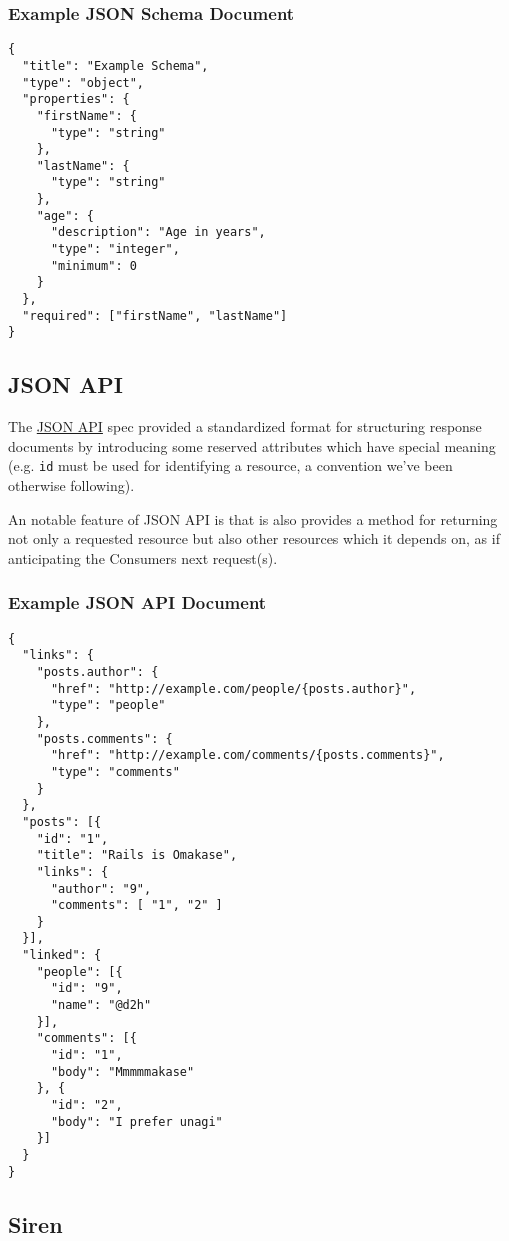 \subsubsection{Example JSON Schema Document}

\begin{verbatim}
{
  "title": "Example Schema",
  "type": "object",
  "properties": {
    "firstName": {
      "type": "string"
    },
    "lastName": {
      "type": "string"
    },
    "age": {
      "description": "Age in years",
      "type": "integer",
      "minimum": 0
    }
  },
  "required": ["firstName", "lastName"]
}
\end{verbatim}

\subsection{JSON API}

The \href{http://jsonapi.org/}{JSON API} \cite{JSONAPI} spec provided a standardized format for structuring response documents by introducing some reserved attributes which have special meaning (e.g. \texttt{id} must be used for identifying a resource, a convention we've been otherwise following).

An notable feature of JSON API is that is also provides a method for returning not only a requested resource but also other resources which it depends on, as if anticipating the Consumers next request(s).

\subsubsection{Example JSON API Document}

\begin{verbatim}
{
  "links": {
    "posts.author": {
      "href": "http://example.com/people/{posts.author}",
      "type": "people"
    },
    "posts.comments": {
      "href": "http://example.com/comments/{posts.comments}",
      "type": "comments"
    }
  },
  "posts": [{
    "id": "1",
    "title": "Rails is Omakase",
    "links": {
      "author": "9",
      "comments": [ "1", "2" ]
    }
  }],
  "linked": {
    "people": [{
      "id": "9",
      "name": "@d2h"
    }],
    "comments": [{
      "id": "1",
      "body": "Mmmmmakase"
    }, {
      "id": "2",
      "body": "I prefer unagi"
    }]
  }
}
\end{verbatim}

\subsection{Siren}

